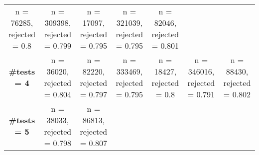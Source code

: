 \documentclass[
]{article}
\begin{document}
\begin{longtable}[]{@{}ccccccc@{}}
\begin{minipage}[t]{0.12\columnwidth}
n = 76285, rejected = 0.8\strut
\end{minipage} & \begin{minipage}[t]{0.13\columnwidth}\centering
n = 309398, rejected = 0.799\strut
\end{minipage} & \begin{minipage}[t]{0.12\columnwidth}\centering
n = 17097, rejected = 0.795\strut
\end{minipage} & \begin{minipage}[t]{0.13\columnwidth}\centering
n = 321039, rejected = 0.795\strut
\end{minipage} & \begin{minipage}[t]{0.13\columnwidth}\centering
n = 82046, rejected = 0.801\strut
\end{minipage}\tabularnewline
\begin{minipage}[t]{0.07\columnwidth}\centering
\textbf{\#tests = 4}\strut
\end{minipage} & \begin{minipage}[t]{0.12\columnwidth}\centering
n = 36020, rejected = 0.804\strut
\end{minipage} & \begin{minipage}[t]{0.12\columnwidth}\centering
n = 82220, rejected = 0.797\strut
\end{minipage} & \begin{minipage}[t]{0.13\columnwidth}\centering
n = 333469, rejected = 0.795\strut
\end{minipage} & \begin{minipage}[t]{0.12\columnwidth}\centering
n = 18427, rejected = 0.8\strut
\end{minipage} & \begin{minipage}[t]{0.13\columnwidth}\centering
n = 346016, rejected = 0.791\strut
\end{minipage} & \begin{minipage}[t]{0.13\columnwidth}\centering
n = 88430, rejected = 0.802\strut
\end{minipage}\tabularnewline
\begin{minipage}[t]{0.07\columnwidth}\centering
\textbf{\#tests = 5}\strut
\end{minipage} & \begin{minipage}[t]{0.12\columnwidth}\centering
n = 38033, rejected = 0.798\strut
\end{minipage} & \begin{minipage}[t]{0.12\columnwidth}\centering
n = 86813, rejected = 0.807\strut
\end{minipage} & \begin{minipage}[t]{0.13\columnwidth}\centering

\end{minipage}
\end{longtable}
\end{document}

